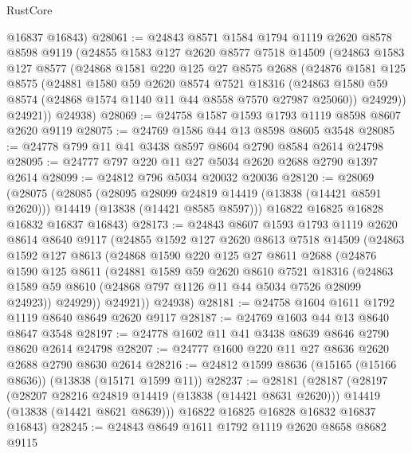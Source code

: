 \begin{lexlean}{RustCore}
\begin{coremodule}
      @16837
      @16843)
@28061 := @24843
    @8571
    @1584
    @1794
    @1119
    @2620
    @8578
    @8598
    @9119
    (@24855
      @1583
      @127
      @2620
      @8577
      @7518
      @14509
      (@24863
        @1583
        @127
        @8577
        (@24868
          @1581
          @220
          @125
          @27
          @8575
          @2688
          (@24876
            @1581
            @125
            @8575
            (@24881
              @1580
              @59
              @2620
              @8574
              @7521
              @18316
              (@24863 @1580 @59 @8574 (@24868 @1574 @1140 @11 @44 @8558 @7570 @27987 @25060))
              @24929))
          @24921))
      @24938)
@28069 := @24758 @1587 @1593 @1793 @1119 @8598 @8607 @2620 @9119
@28075 := @24769 @1586 @44 @13 @8598 @8605 @3548
@28085 := @24778 @799 @11 @41 @3438 @8597 @8604 @2790 @8584 @2614 @24798
@28095 := @24777 @797 @220 @11 @27 @5034 @2620 @2688 @2790 @1397 @2614
@28099 := @24812 @796 @5034 @20032 @20036
@28120 := @28069
    (@28075
      (@28085
        (@28095 @28099 @24819 @14419 (@13838 (@14421 @8591 @2620)))
        @14419
        (@13838 (@14421 @8585 @8597)))
      @16822
      @16825
      @16828
      @16832
      @16837
      @16843)
@28173 := @24843
    @8607
    @1593
    @1793
    @1119
    @2620
    @8614
    @8640
    @9117
    (@24855
      @1592
      @127
      @2620
      @8613
      @7518
      @14509
      (@24863
        @1592
        @127
        @8613
        (@24868
          @1590
          @220
          @125
          @27
          @8611
          @2688
          (@24876
            @1590
            @125
            @8611
            (@24881
              @1589
              @59
              @2620
              @8610
              @7521
              @18316
              (@24863 @1589 @59 @8610 (@24868 @797 @1126 @11 @44 @5034 @7526 @28099 @24923))
              @24929))
          @24921))
      @24938)
@28181 := @24758 @1604 @1611 @1792 @1119 @8640 @8649 @2620 @9117
@28187 := @24769 @1603 @44 @13 @8640 @8647 @3548
@28197 := @24778 @1602 @11 @41 @3438 @8639 @8646 @2790 @8620 @2614 @24798
@28207 := @24777 @1600 @220 @11 @27 @8636 @2620 @2688 @2790 @8630 @2614
@28216 := @24812 @1599 @8636 (@15165 (@15166 @8636)) (@13838 (@15171 @1599 @11))
@28237 := @28181
    (@28187
      (@28197
        (@28207 @28216 @24819 @14419 (@13838 (@14421 @8631 @2620)))
        @14419
        (@13838 (@14421 @8621 @8639)))
      @16822
      @16825
      @16828
      @16832
      @16837
      @16843)
@28245 := @24843 @8649 @1611 @1792 @1119 @2620 @8658 @8682 @9115

\end{coremodule}
\end{lexlean}
